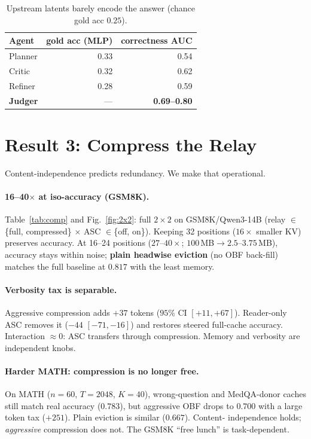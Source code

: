 \documentclass[11pt]{article}
\begin{document}
\begin{table}[t]
\centering\small
\caption{Upstream latents barely encode the answer (chance gold acc $0.25$).}
\label{tab:probe}
\begin{tabular}{@{}lrr@{}}
\toprule
Agent & gold acc (MLP) & correctness AUC \\
\midrule
Planner & 0.33 & 0.54 \\
Critic  & 0.32 & 0.62 \\
Refiner & 0.28 & 0.59 \\
\textbf{Judger} & --- & \textbf{0.69--0.80} \\
\bottomrule
\end{tabular}
\end{table}

\section{Result 3: Compress the Relay}
\label{sec:exploit}
Content-independence predicts redundancy. We make that operational.

\paragraph{16--40$\times$ at iso-accuracy (GSM8K).}
Table~\ref{tab:comp} and Fig.~\ref{fig:2x2}: full $2{\times}2$ on
GSM8K/Qwen3-14B (relay $\in$\{full, compressed\} $\times$ ASC
$\in$\{off, on\}). Keeping 32 positions ($16\times$ smaller KV) preserves
accuracy. At 16--24 positions ($27$--$40\times$; $100\,$MB$\to 2.5$--$3.75\,$MB),
accuracy stays within noise; \textbf{plain headwise eviction} (no OBF back-fill)
matches the full baseline at $0.817$ with the least memory.

\paragraph{Verbosity tax is separable.} Aggressive compression adds
$+37$ tokens ($95\%$ CI $[+11,+67]$). Reader-only ASC removes it
($-44$ $[-71,-16]$) and restores steered full-cache accuracy. Interaction
$\approx 0$: ASC transfers through compression. Memory and verbosity are
independent knobs.

\paragraph{Harder MATH: compression is no longer free.}
On MATH ($n{=}60$, $T{=}2048$, $K{=}40$), wrong-question and MedQA-donor caches
still match real accuracy ($0.783$), but aggressive OBF drops to $0.700$ with a
large token tax ($+251$). Plain eviction is similar ($0.667$). Content-
independence holds; \emph{aggressive} compression does not. The GSM8K ``free
lunch'' is task-dependent.
\end{document}
